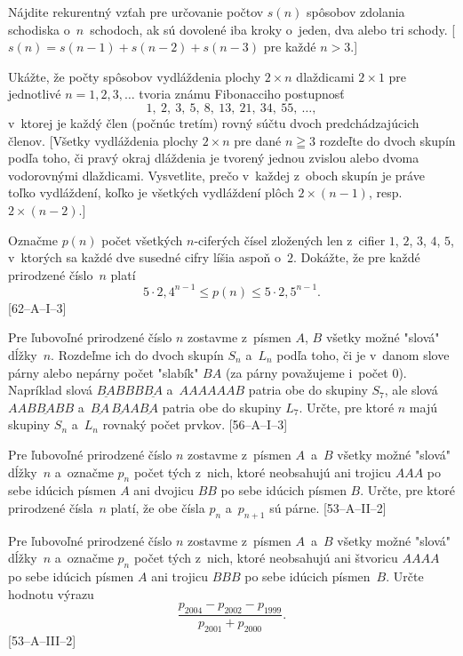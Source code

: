 {
Nájdite rekurentný vzťah pre určovanie počtov $s(n)$ spôsobov
zdolania schodiska o~$n$~schodoch, ak sú dovolené iba kroky
o~jeden, dva alebo tri schody. [$s(n)=s(n-1)+s(n-2)+s(n-3)$ pre každé
$n>3$.]

Ukážte, že počty spôsobov vydláždenia plochy $2\times n$
dlaždicami $2\times1$ pre jednotlivé $n=1, 2, 3,\dots$ tvoria
známu Fibonacciho postupnosť
$$
1,\ 2,\ 3,\ 5,\ 8,\ 13,\ 21,\ 34,\ 55,\ \dots,
$$
v~ktorej je každý člen (počnúc tretím) rovný súčtu dvoch
predchádzajúcich členov. [Všetky vydláždenia plochy $2\times n$ pre
dané $n\geqq3$ rozdeľte do dvoch skupín podľa toho, či pravý
okraj dláždenia je tvorený jednou zvislou alebo dvoma vodorovnými
dlaždicami. Vysvetlite, prečo v~každej z~oboch skupín je práve toľko
vydláždení, koľko je všetkých vydláždení plôch $2\times(n-1)$,
resp. $2\times(n-2)$.]

Označme $p(n)$
počet všetkých $n$-ciferých čísel zložených len z~cifier
$1$, $2$, $3$, $4$, $5$, v~ktorých
sa každé dve susedné cifry líšia aspoň o~$2$.
Dokážte, že pre každé prirodzené číslo~$n$ platí
$$
5\cdot2{,}4^{n-1}\le p(n)\le 5\cdot2{,}5^{n-1}.
$$
[62--A--I--3]

Pre ľubovoľné prirodzené číslo $n$ zostavme
z~písmen $A$, $B$ všetky možné "slová" dĺžky~$n$.
Rozdeľme ich do dvoch skupín $S_n$ a~$L_n$ podľa toho, či je v~danom slove
párny alebo nepárny počet "slabík" $BA$ (za párny
považujeme i~počet $0$). Napríklad slová
$\underline{BA}BBB\underline{BA}$ a~$AAAAAAB$ patria obe
do skupiny $S_7$, ale slová $AAB\underline{BA}BB$
a~$\underline{BA}\,\underline{BA}A\underline{BA}$ patria obe
do skupiny $L_7$. Určte, pre ktoré $n$ majú skupiny
$S_n$ a~$L_n$ rovnaký počet prvkov. [56--A--I--3]

Pre ľubovoľné prirodzené číslo $n$ zostavme z~písmen $A$~a~$B$
všetky možné "slová" dĺžky~$n$ a~označme $p_n$ počet tých z~nich,
ktoré neobsahujú ani trojicu $AAA$ po sebe idúcich písmen $A$
ani dvojicu $BB$ po sebe idúcich písmen $B$. Určte,
pre ktoré prirodzené čísla~$n$ platí, že obe čísla
$p_n$ a~$p_{n+1}$ sú párne. [53--A--II--2]

Pre ľubovoľné prirodzené číslo $n$ zostavme z~písmen $A$~a~$B$ všetky možné
"slová" dĺžky~$n$ a~označme $p_n$ počet tých z~nich,
ktoré neobsahujú ani štvoricu $AAAA$ po sebe idúcich písmen $A$
ani trojicu $BBB$ po sebe idúcich písmen~$B$. Určte hodnotu výrazu
$$\frac{p_{2004}-p_{2002}-p_{1999}}{p_{2001}+p_{2000}}.
$$
[53--A--III--2]
}

